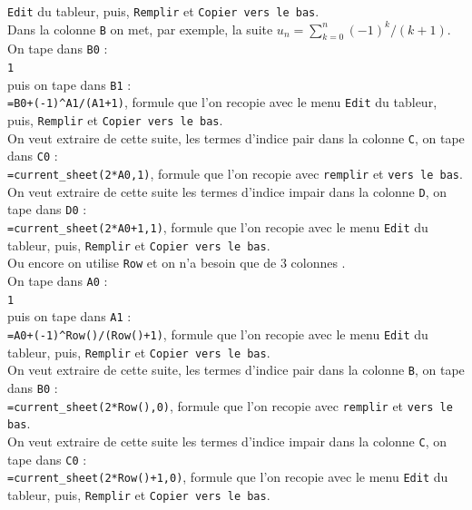 \documentclass[a4paper,11pt]{book}
\begin{document}
{\tt Edit} du tableur, puis, {\tt Remplir} et {\tt Copier vers le bas}.\\
Dans la colonne {\tt B} on met, par exemple, la suite  
$u_n=\sum_{k=0}^n(-1)^k/(k+1)$.\\
On tape dans  {\tt B0} :\\ 
{\tt 1}\\
puis on tape dans {\tt B1} :\\
{\tt =B0+(-1)\verb|^|A1/(A1+1)}, formule que l'on recopie avec le menu 
{\tt Edit} du tableur, puis, {\tt Remplir} et {\tt Copier vers le bas}.\\
On veut extraire de cette suite, les termes d'indice pair dans la colonne 
{\tt C}, on tape dans {\tt C0} :\\
{\tt =current\_sheet(2*A0,1)}, formule que l'on recopie 
avec {\tt remplir} et {\tt vers le bas}.\\
On veut extraire de cette suite les termes d'indice impair dans la colonne 
{\tt D}, on tape dans {\tt D0} :\\
 {\tt =current\_sheet(2*A0+1,1)}, formule que l'on recopie avec le menu 
{\tt Edit} du tableur, puis, {\tt Remplir} et {\tt Copier vers le bas}.\\
Ou encore on utilise {\tt Row} et on n'a besoin que de 3 colonnes .\\
On tape dans {\tt A0} :\\
{\tt 1}\\
 puis on tape dans {\tt A1} :\\
{\tt =A0+(-1)\verb|^|Row()/(Row()+1)}, formule que l'on recopie avec le menu 
{\tt Edit} du tableur, puis, {\tt Remplir} et {\tt Copier vers le bas}.\\
On veut extraire de cette suite, les termes d'indice pair dans la colonne 
{\tt B}, on tape dans {\tt B0} :\\
{\tt =current\_sheet(2*Row(),0)}, formule que l'on recopie 
avec {\tt remplir} et {\tt vers le bas}.\\
On veut extraire de cette suite les termes d'indice impair dans la colonne 
{\tt C}, on tape dans {\tt C0} :\\
 {\tt =current\_sheet(2*Row()+1,0)}, formule que l'on recopie avec le menu 
{\tt Edit} du tableur, puis, {\tt Remplir} et {\tt Copier vers le bas}.
\end{document}
